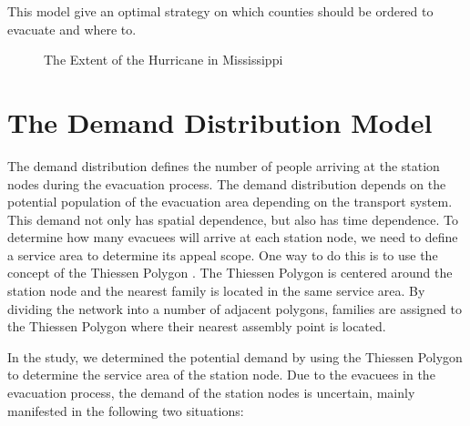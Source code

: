 \documentclass{mcmthesis}
\begin{document}
This model give an optimal strategy on which counties should be ordered to evacuate and where to.

\begin{figure}[tbp]
  \caption{The Extent of the Hurricane in Mississippi}\label{figure1}
\end{figure}

\section{The Demand Distribution Model}

The demand distribution defines the number of people arriving at the station nodes during the evacuation process. The demand distribution depends on the potential population of the evacuation area depending on the transport system. This demand not only has spatial dependence, but also has time dependence. To determine how many evacuees will arrive at each station node, we need to define a service area to determine its appeal scope. One way to do this is to use the concept of the Thiessen Polygon \cite{Bretschneider2011A}. The Thiessen Polygon is centered around the station node and the nearest family is located in the same service area. By dividing the network into a number of adjacent polygons, families are assigned to the Thiessen Polygon where their nearest assembly point is located.

In the study, we determined the potential demand by using the Thiessen Polygon to determine the service area of the station node. Due to the evacuees in the evacuation process, the demand of the station nodes is uncertain, mainly manifested in the following two situations:
\end{document}
